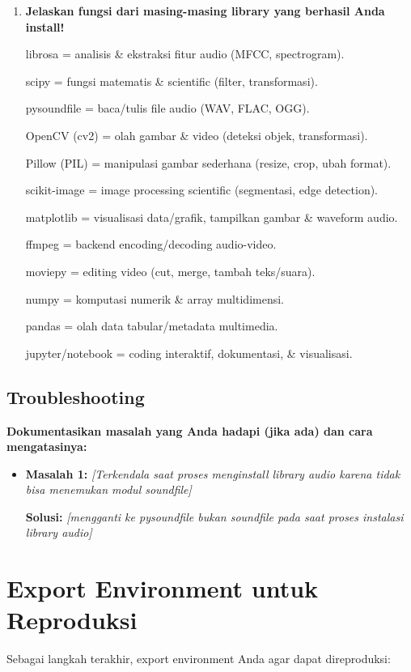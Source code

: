 \documentclass[11pt,a4paper]{article}
\begin{document}
\begin{enumerate}
    \item \textbf{Jelaskan fungsi dari masing-masing library yang berhasil Anda install!}
    
    \begin{itshape}
    librosa = analisis \& ekstraksi fitur audio (MFCC, spectrogram). \par
    scipy = fungsi matematis \& scientific (filter, transformasi). \par
    pysoundfile = baca/tulis file audio (WAV, FLAC, OGG). \par
    OpenCV (cv2) = olah gambar \& video (deteksi objek, transformasi). \par
    Pillow (PIL) = manipulasi gambar sederhana (resize, crop, ubah format). \par
    scikit-image = image processing scientific (segmentasi, edge detection). \par
    matplotlib = visualisasi data/grafik, tampilkan gambar \& waveform audio. \par
    ffmpeg = backend encoding/decoding audio-video. \par
    moviepy = editing video (cut, merge, tambah teks/suara). \par
    numpy = komputasi numerik \& array multidimensi. \par
    pandas = olah data tabular/metadata multimedia. \par
    jupyter/notebook = coding interaktif, dokumentasi, \& visualisasi.
    \end{itshape}
\end{enumerate}

\subsection{Troubleshooting}
\textbf{Dokumentasikan masalah yang Anda hadapi (jika ada) dan cara mengatasinya:}

\begin{itemize}
    \item \textbf{Masalah 1:} \textit{[Terkendala saat proses menginstall library audio karena tidak bisa menemukan modul soundfile]}
    
    \textbf{Solusi:} \textit{[mengganti ke pysoundfile bukan soundfile pada saat proses instalasi library audio]}
    
\end{itemize}

\section{Export Environment untuk Reproduksi}
Sebagai langkah terakhir, export environment Anda agar dapat direproduksi:
\end{document}
